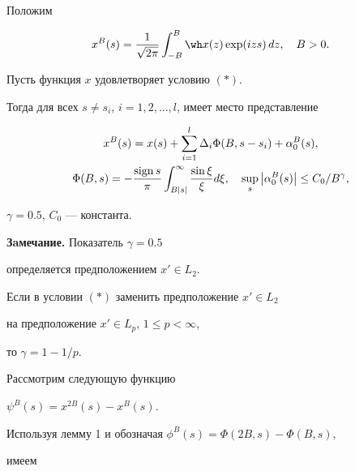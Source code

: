Положим


$$


x^B(s)=\frac{1}{\sqrt{2\pi}}\int_{-B}^{B}\wh x(z)\exp(izs)


\,dz,\quad B>0.


$$





\begin{lem}


Пусть функция $x$ удовлетворяет условию $(*)$.


Тогда для всех $s\ne s_i$, $i=1,2,\dotsc,l$, имеет место представление


\begin{gather*}






x^B(s)=x(s)+\sum_{i=1}^l\Delta_i\Phi (B,s-s_i) +\alpha_0^B(s),\\






\Phi (B,s)=-\frac {\sign s}{\pi } \int_{B| s|}


^{\infty } \frac {\sin \xi }{\xi } d\xi,\quad


\sup\limits_s\Mod {\alpha_0^B(s)}\leq C_0/B^{\gamma},


\end{gather*}


$\gamma=0.5$, $C_0$ --- константа.


\end{lem}





{\bf Зaмечание.} Показатель $\gamma=0.5$


определяется предположением $x'\in L_2$.


Если в условии $(*)$ заменить предположение $x'\in L_2$


на предположение $x'\in L_p$, $1\le p <\infty$,


то $\gamma=1-1/p$.





Рассмотрим следующую функцию


$\psi^B(s)=x^{2B}(s)-x^B(s)$.


Используя лемму 1 и обозначая $\phi^B(s)=\Phi (2B,s)-\Phi (B,s)$,


имеем


